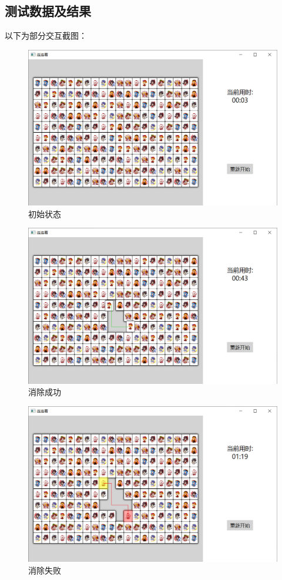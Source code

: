 \documentclass[a4paper,UTF8]{ctexart}
\begin{document}
\subsection{测试数据及结果}
以下为部分交互截图：
\begin{figure}[H]
\centering\includegraphics[width=\textwidth]{image01.png}\caption{初始状态}
\end{figure}
\begin{figure}[H]
\centering\includegraphics[width=\textwidth]{image02.png}\caption{消除成功}
\end{figure}
\begin{figure}[H]
\centering\includegraphics[width=\textwidth]{image03.png}\caption{消除失败}
\end{figure}
\end{document}
